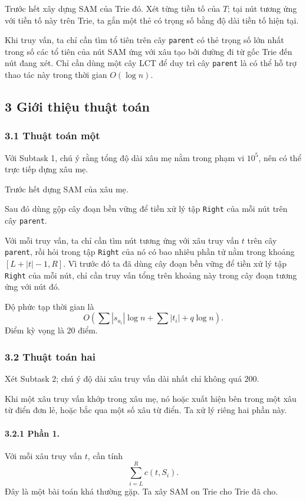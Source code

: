 \documentclass[11pt]{article}
\begin{document}
Trước hết xây dựng SAM của Trie đó. Xét từng tiền tố của \(T\); tại nút tương
ứng với tiền tố này trên Trie, ta gắn một thẻ có trọng số bằng độ dài tiền tố
hiện tại.

Khi truy vấn, ta chỉ cần tìm tổ tiên trên cây \texttt{parent} có thẻ trọng số
lớn nhất trong số các tổ tiên của nút SAM ứng với xâu tạo bởi đường đi từ gốc
Trie đến nút đang xét. Chỉ cần dùng một cây LCT để duy trì cây \texttt{parent}
là có thể hỗ trợ thao tác này trong thời gian \(O(\log n)\).

\subsection*{3 Giới thiệu thuật toán}

\subsubsection*{3.1 Thuật toán một}

Với Subtask 1, chú ý rằng tổng độ dài xâu mẹ nằm trong phạm vi \(10^5\), nên
có thể trực tiếp dựng xâu mẹ.

Trước hết dựng SAM của xâu mẹ.

Sau đó dùng gộp cây đoạn bền vững để tiền xử lý tập \texttt{Right} của mỗi nút
trên cây \texttt{parent}.

Với mỗi truy vấn, ta chỉ cần tìm nút tương ứng với xâu truy vấn \(t\) trên cây
\texttt{parent}, rồi hỏi trong tập \texttt{Right} của nó có bao nhiêu phần tử
nằm trong khoảng \([L+|t|-1,R]\). Vì trước đó ta đã dùng cây đoạn bền vững để
tiền xử lý tập \texttt{Right} của mỗi nút, chỉ cần truy vấn tổng trên khoảng
này trong cây đoạn tương ứng với nút đó.

Độ phức tạp thời gian là
\[
  O\left(\sum |s_{a_i}|\log n+\sum |t_i|+q\log n\right).
\]
Điểm kỳ vọng là \(20\) điểm.

\subsubsection*{3.2 Thuật toán hai}

Xét Subtask 2; chú ý độ dài xâu truy vấn dài nhất chỉ không quá \(200\).

Khi một xâu truy vấn khớp trong xâu mẹ, nó hoặc xuất hiện bên trong một xâu từ
điển đơn lẻ, hoặc bắc qua một số xâu từ điển. Ta xử lý riêng hai phần này.

\paragraph{3.2.1 Phần 1.}
Với mỗi xâu truy vấn \(t\), cần tính
\[
  \sum_{i=L}^{R} c(t,S_i).
\]
Đây là một bài toán khá thường gặp. Ta xây SAM on Trie cho Trie đã cho.
\end{document}
